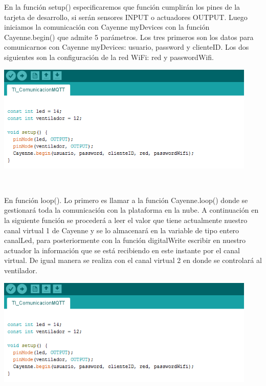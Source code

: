 \documentclass[letterpaper, 10 pt, conference]{ieeeconf}
\begin{document}
En la función setup() especificaremos que función cumplirán los pines de la tarjeta de desarrollo, si serán sensores INPUT o actuadores OUTPUT.
Luego iniciamos la comunicación con Cayenne myDevices con la función Cayenne.begin() que admite 5 parámetros. Los tres primeros son los datos para comunicarnos con Cayenne myDevices: usuario, password y clienteID.
Los dos siguientes son la configuración de la red WiFi: red y passwordWifi.

\begin{center}
\includegraphics[scale=0.5]{Figura5.png}
\begin{scriptsize}\\ 
 
\end{scriptsize}
\end{center}

En función loop(). Lo primero es llamar a la función Cayenne.loop() donde se gestionará toda la comunicación con la plataforma en la nube.
A continuación en la siguiente función se procederá a leer el valor que tiene actualmente nuestro canal virtual 1 de Cayenne y se lo almacenará en la variable de tipo entero canalLed, para posteriormente con la función digitalWrite escribir en nuestro actuador la información que se está recibiendo en este instante por el canal virtual.
De igual manera se realiza con el canal virtual 2 en donde se controlará al ventilador.

\begin{center}
\includegraphics[scale=0.5]{Figura5.png}
\begin{scriptsize}\\ 
 
\end{scriptsize}
\end{center}
\end{document}

